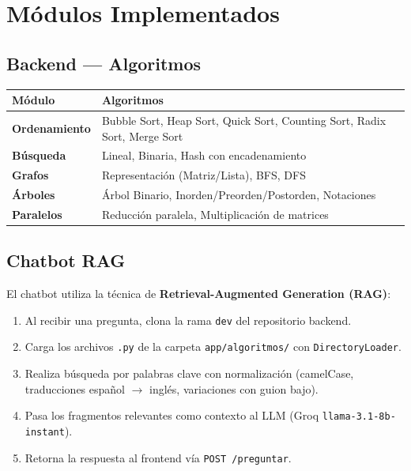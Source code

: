 \documentclass[12pt, letterpaper]{article}
\begin{document}
	\section{Módulos Implementados}
	\subsection{Backend — Algoritmos}
	\begin{table}[h!]
		\centering
		\begin{tabular}{@{}lp{10cm}@{}}
			\toprule
			\textbf{Módulo} & \textbf{Algoritmos} \\
			\midrule
			\textbf{Ordenamiento} & Bubble Sort, Heap Sort, Quick Sort, Counting Sort, Radix Sort, Merge Sort \\
			\textbf{Búsqueda} & Lineal, Binaria, Hash con encadenamiento \\
			\textbf{Grafos} & Representación (Matriz/Lista), BFS, DFS \\
			\textbf{Árboles} & Árbol Binario, Inorden/Preorden/Postorden, Notaciones \\
			\textbf{Paralelos} & Reducción paralela, Multiplicación de matrices \\
			\bottomrule
		\end{tabular}
	\end{table}
	
	\subsection{Chatbot RAG}
	El chatbot utiliza la técnica de \textbf{Retrieval-Augmented Generation (RAG)}:
	\begin{enumerate}
		\item Al recibir una pregunta, clona la rama \texttt{dev} del repositorio backend.
		\item Carga los archivos \texttt{.py} de la carpeta \texttt{app/algoritmos/} con \texttt{DirectoryLoader}.
		\item Realiza búsqueda por palabras clave con normalización (camelCase, traducciones español $\to$ inglés, variaciones con guion bajo).
		\item Pasa los fragmentos relevantes como contexto al LLM (Groq \texttt{llama-3.1-8b-instant}).
		\item Retorna la respuesta al frontend vía \texttt{POST /preguntar}.
	\end{enumerate}
	
\end{document}
